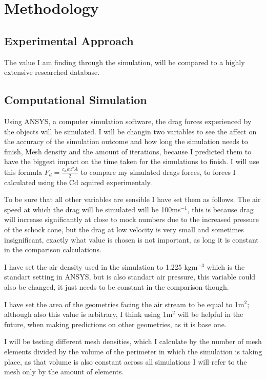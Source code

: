 \documentclass[12pt,a4paper]{article}
\begin{document}
\section{Methodology}

\subsection{Experimental Approach}

The value I am finding through the simulation, will be compared to a highly extensive researched database.

\subsection{Computational Simulation}

Using ANSYS, a computer simulation software, the drag forces experienced by the objects will be simulated. I will be changin two variables to see the affect on the accuracy of the simulation outcome and how long the simulation needs to finish, Mesh density and the amount of iterations, because I predicted them to have the biggest impact on the time taken for the simulations to finish. I will use this formula $F_d = \frac{c_d \rho u^2 A}{2}$ to compare my simulated drags forces, to forces I calculated using the Cd aquired experimentaly. 

To be sure that all other variables are sensible I have set them as follows. The air speed at which the drag will be simulated will be 100ms$^{-1}$, this is because drag will increase significantly at close to mock numbers due to the increased pressure of the schock cone, but the drag at low velocity is very small and sometimes insignificant, exactly what value is chosen is not important, as long it is constant in the comparison calculations. 

I have set the air density used in the simulation to 1.225 kgm$^{-3}$ which is the standart setting in ANSYS, but is also standart air pressure, this variable could also be changed, it just needs to be constant in the comparison though.

 I have set the area of the geometries facing the air stream to be equal to 1m$^2$; although also this value is arbitrary, I think using 1m$^2$ will be helpful in the future, when making predictions on other geometries, as it is base one.

I will be testing different mesh densities, which I calculate by the number of mesh elements divided by the volume of the perimeter in which the simulation is taking place, as that volume is also constant across all simulations I will refer to the mesh only by the amount of elements.
\end{document}

